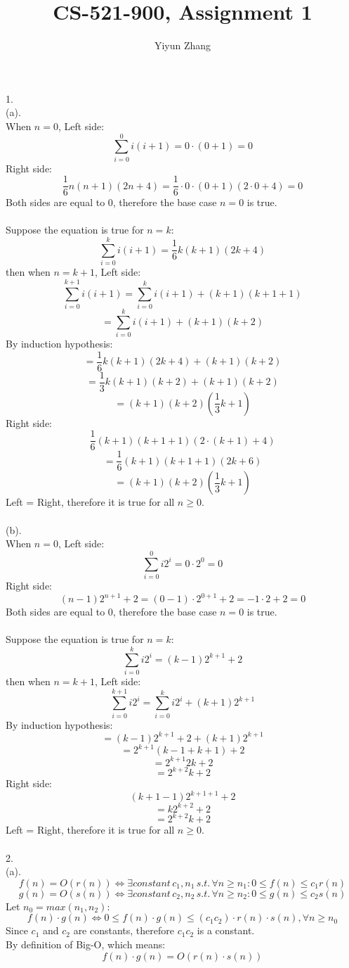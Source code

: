 \documentclass{article}
\title{CS-521-900, Assignment 1}
\author{Yiyun Zhang}
\begin{document}
\maketitle
$ $
\\
1.
\\
(a).
\\
When $n=0$, Left side: $$\sum_{i=0}^{0}i(i+1)=0\cdot(0+1)= 0$$
Right side: $$\dfrac{1}{6}n(n+1)(2n+4)=\dfrac{1}{6}\cdot0\cdot(0+1)(2\cdot0+4)=0$$
Both sides are equal to 0, therefore the base case $n=0$ is true.
\\
\\
Suppose the equation is true for $n = k$:
$$\sum_{i=0}^{k}i(i+1)=\dfrac{1}{6}k(k+1)(2k+4)$$
then when $n=k+1$, Left side:
$$\sum_{i=0}^{k+1}i(i+1)=\sum_{i=0}^{k}i(i+1)+(k+1)(k+1+1)$$
$$=\sum_{i=0}^{k}i(i+1)+(k+1)(k+2)$$
By induction hypothesis:
$$=\dfrac{1}{6}k(k+1)(2k+4)+(k+1)(k+2)$$
$$=\dfrac{1}{3}k(k+1)(k+2)+(k+1)(k+2)$$
$$=(k+1)(k+2)(\dfrac{1}{3}k+1)$$
Right side: $$\dfrac{1}{6}(k+1)(k+1+1)(2\cdot(k+1)+4)$$
$$=\dfrac{1}{6}(k+1)(k+1+1)(2k+6)$$
$$=(k+1)(k+2)(\dfrac{1}{3}k+1)$$
Left = Right, therefore it is true for all $n\geq0$.
\\
\\
(b).
\\
When $n=0$, Left side: $$\sum_{i=0}^{0}i2^i=0\cdot2^0= 0$$
Right side: $$(n-1)2^{n+1}+2=(0-1)\cdot2^{0+1}+2=-1\cdot2+2=0$$
Both sides are equal to 0, therefore the base case $n=0$ is true.
\\
\\
Suppose the equation is true for $n = k$:
$$\sum_{i=0}^{k}i2^i=(k-1)2^{k+1}+2$$
then when $n=k+1$, Left side:
$$\sum_{i=0}^{k+1}i2^i=\sum_{i=0}^{k}i2^i+(k+1)2^{k+1}$$
By induction hypothesis:
$$=(k-1)2^{k+1}+2+(k+1)2^{k+1}$$
$$=2^{k+1}(k-1+k+1)+2$$
$$=2^{k+1}2k+2$$
$$=2^{k+2}k+2$$
Right side: $$(k+1-1)2^{k+1+1}+2$$
$$=k2^{k+2}+2$$
$$=2^{k+2}k+2$$
Left = Right, therefore it is true for all $n\geq0$.
\\
\\
2.
\\
(a).
$$f(n)=O(r(n)) \iff \exists constant\,c_{1},n_{1}\,s.t.\,\forall n\geq n_{1}:0\leq f(n)\leq c_{1}r(n)$$
$$g(n)=O(s(n)) \iff \exists constant\,c_{2},n_{2}\,s.t.\,\forall n\geq n_{2}:0\leq g(n)\leq c_{2}s(n)$$
Let $n_{0}=max(n_{1},n_{2}):$ 
$$f(n)\cdot g(n)\iff 0\leq f(n)\cdot g(n)\leq (c_{1}c_{2})\cdot r(n)\cdot s(n),\forall n\geq n_{0}$$
Since $c_{1}$ and $c_{2}$ are constants, therefore $c_{1}c_{2}$ is a constant.
\\
By definition of Big-O, which means: $$f(n)\cdot g(n) =O(r(n)\cdot s(n))$$
\end{document}
